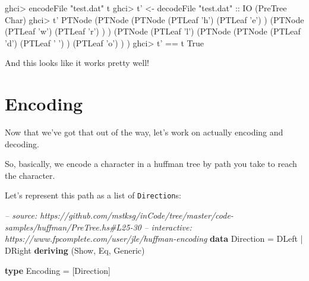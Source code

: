 \documentclass[]{article}
\newenvironment{Shaded}{\begin{snugshade}}{\end{snugshade}}
\newcommand{\CharTok}[1]{\textcolor[rgb]{0.31,0.60,0.02}{#1}}
\newcommand{\CommentTok}[1]{\textcolor[rgb]{0.56,0.35,0.01}{\textit{#1}}}
\newcommand{\DataTypeTok}[1]{\textcolor[rgb]{0.13,0.29,0.53}{#1}}
\newcommand{\FunctionTok}[1]{\textcolor[rgb]{0.00,0.00,0.00}{#1}}
\newcommand{\KeywordTok}[1]{\textcolor[rgb]{0.13,0.29,0.53}{\textbf{#1}}}
\newcommand{\NormalTok}[1]{#1}
\newcommand{\OtherTok}[1]{\textcolor[rgb]{0.56,0.35,0.01}{#1}}
\newcommand{\StringTok}[1]{\textcolor[rgb]{0.31,0.60,0.02}{#1}}
\begin{document}
\begin{Shaded}
\begin{Highlighting}[]
\NormalTok{ghci}\FunctionTok{>}\NormalTok{ encodeFile }\StringTok{"test.dat"}\NormalTok{ t}
\NormalTok{ghci}\FunctionTok{>}\NormalTok{ t' }\OtherTok{<-}\NormalTok{ decodeFile }\StringTok{"test.dat"}\OtherTok{ ::} \DataTypeTok{IO}\NormalTok{ (}\DataTypeTok{PreTree} \DataTypeTok{Char}\NormalTok{)}
\NormalTok{ghci}\FunctionTok{>}\NormalTok{ t'}
\DataTypeTok{PTNode}\NormalTok{ (}\DataTypeTok{PTNode}\NormalTok{ (}\DataTypeTok{PTNode}\NormalTok{ (}\DataTypeTok{PTLeaf} \CharTok{'h'}\NormalTok{)}
\NormalTok{                       (}\DataTypeTok{PTLeaf} \CharTok{'e'}\NormalTok{)}
\NormalTok{               )}
\NormalTok{               (}\DataTypeTok{PTNode}\NormalTok{ (}\DataTypeTok{PTLeaf} \CharTok{'w'}\NormalTok{)}
\NormalTok{                       (}\DataTypeTok{PTLeaf} \CharTok{'r'}\NormalTok{)}
\NormalTok{               )}
\NormalTok{       )}
\NormalTok{       (}\DataTypeTok{PTNode}\NormalTok{ (}\DataTypeTok{PTLeaf} \CharTok{'l'}\NormalTok{)}
\NormalTok{               (}\DataTypeTok{PTNode}\NormalTok{ (}\DataTypeTok{PTNode}\NormalTok{ (}\DataTypeTok{PTLeaf} \CharTok{'d'}\NormalTok{)}
\NormalTok{                               (}\DataTypeTok{PTLeaf} \CharTok{' '}\NormalTok{)}
\NormalTok{                       )}
\NormalTok{                       (}\DataTypeTok{PTLeaf} \CharTok{'o'}\NormalTok{)}
\NormalTok{               )}
\NormalTok{       )}
\NormalTok{ghci}\FunctionTok{>}\NormalTok{ t' }\FunctionTok{==}\NormalTok{ t}
\DataTypeTok{True}
\end{Highlighting}
\end{Shaded}

And this looks like it works pretty well!

\hypertarget{encoding}{%
\section{Encoding}\label{encoding}}

Now that we've got that out of the way, let's work on actually encoding and
decoding.

So, basically, we encode a character in a huffman tree by path you take to reach
the character.

Let's represent this path as a list of \texttt{Direction}s:

\begin{Shaded}
\begin{Highlighting}[]
\CommentTok{-- source: https://github.com/mstksg/inCode/tree/master/code-samples/huffman/PreTree.hs#L25-30}
\CommentTok{-- interactive: https://www.fpcomplete.com/user/jle/huffman-encoding}
\KeywordTok{data} \DataTypeTok{Direction} \FunctionTok{=} \DataTypeTok{DLeft}
               \FunctionTok{|} \DataTypeTok{DRight}
               \KeywordTok{deriving}\NormalTok{ (}\DataTypeTok{Show}\NormalTok{, }\DataTypeTok{Eq}\NormalTok{, }\DataTypeTok{Generic}\NormalTok{)}

\KeywordTok{type} \DataTypeTok{Encoding} \FunctionTok{=}\NormalTok{ [}\DataTypeTok{Direction}\NormalTok{]}
\end{Highlighting}
\end{Shaded}
\end{document}
